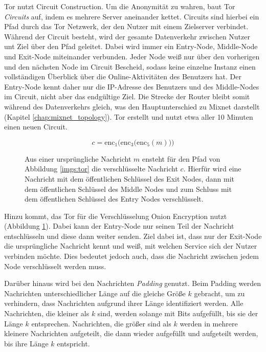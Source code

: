 Tor nutzt Circuit Construction. Um die Anonymität zu wahren, baut Tor \textit{Circuits} auf, indem es mehrere Server aneinander kettet. Circuits sind hierbei ein Pfad durch das Tor Netzwerk, der den Nutzer mit einem Zielserver verbindet. Während der Circuit besteht, wird der gesamte Datenverkehr zwischen Nutzer unt Ziel über den Pfad geleitet. Dabei wird immer ein Entry-Node, Middle-Node und Exit-Node miteinander verbunden. Jeder Node weiß nur über den vorherigen und den nächsten Node im Circuit Bescheid, sodass keine einzelne Instanz einen vollständigen Überblick über die Online-Aktivitäten des Benutzers hat. Der Entry-Node kennt daher nur die IP-Adresse des Benutzers und des Middle-Nodes im Circuit, nicht aber das endgültige Ziel. Die Strecke der Router bleibt somit während des Datenverkehrs gleich, was den Hauptunterschied zu Mixnet darstellt (Kapitel \ref{chap:mixnet_topology}). Tor erstellt und nutzt etwa aller 10 Minuten einen neuen Circuit.

\begin{figure}[!h]
    \begin{displaymath}
        c = \mathrm{enc}_{1}\Big(\mathrm{enc}_{3}\big(\mathrm{enc}_{5}(m)\big)\Big)
    \end{displaymath}
    \caption{Aus einer ursprüngliche Nachricht $m$ ensteht für den Pfad von Abbildung \ref{imgs:tor} die verschlüsselte Nachricht $c$. Hierfür wird eine Nachricht mit dem öffentlichen Schlüssel des Exit Nodes, dann mit dem öffentlichen Schlüssel des Middle Nodes und zum Schluss mit dem öffentlichen Schlüssel des Entry Nodes verschlüsselt.}
    \label{equa:encryption}
\end{figure}

Hinzu kommt, das Tor für die Verschlüsselung Onion Encryption nutzt (Abbildung \ref{equa:encryption}). Dabei kann der Entry-Node nur seinen Teil der Nachricht entschlüsseln und diese dann weiter senden. Ziel dabei ist, dass nur der Exit-Node die ursprüngliche Nachricht kennt und weiß, mit welchen Service sich der Nutzer verbinden möchte. Dies bedeutet jedoch auch, dass die Nachricht zwischen jedem Node verschlüsselt werden muss.

Darüber hinaus wird bei den Nachrichten \textit{Padding} genutzt. Beim Padding werden Nachrichten unterschiedlicher Länge auf die gleiche Größe $k$ gebracht, um zu verhindern, dass Nachrichten aufgrund ihrer Länge identifiziert werden. Alle Nachrichten, die kleiner als $k$ sind, werden solange mit Bits aufgefüllt, bis sie der Länge $k$ entsprechen. Nachrichten, die größer sind als $k$ werden in mehrere kleinere Nachrichten aufgeteilt, die dann wieder aufgefüllt und aufgeteilt werden, bis ihre Länge $k$ entspricht.

